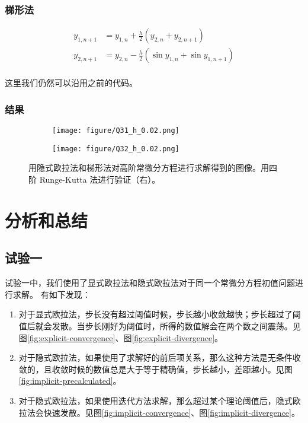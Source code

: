 \documentclass{article}
\begin{document}
\subsubsection{梯形法}
\begin{equation*}
    \begin{aligned}
        y_{1,n+1}&=y_{1,n}+\frac{h}{2}(y_{2,n}+y_{2,n+1})\\
        y_{2,n+1}&=y_{2,n}-\frac{h}{2}(\sin y_{1,n}+\sin y_{1,n+1})\\
    \end{aligned}
\end{equation*}

这里我们仍然可以沿用之前的代码。

\subsubsection{结果}
\begin{figure*}[h]
    \centering
    \begin{subfigure}[h]{0.45\textwidth}
        \centering
        \texttt{[image: figure/Q31\_h\_0.02.png]}
    \end{subfigure}
    \centering
    \begin{subfigure}[h]{0.45\textwidth}
        \centering
        \texttt{[image: figure/Q32\_h\_0.02.png]}
    \end{subfigure}
    \caption{用隐式欧拉法和梯形法对高阶常微分方程进行求解得到的图像。用四阶 Runge-Kutta 法进行验证（右）。}
    \label{fig:system}
\end{figure*}


\section{分析和总结}
\subsection{试验一}
试验一中，我们使用了显式欧拉法和隐式欧拉法对于同一个常微分方程初值问题进行求解。
有如下发现：
\begin{enumerate}
    \item 对于显式欧拉法，步长没有超过阈值时候，步长越小收敛越快；步长超过了阈值后就会发散。当步长刚好为阈值时，所得的数值解会在两个数之间震荡。见图\ref{fig:explicit-convergence}、图\ref{fig:explicit-divergence}。
    \item 对于隐式欧拉法，如果使用了求解好的前后项关系，那么这种方法是无条件收敛的，且收敛时候的数值总是大于等于精确值，步长越小，差距越小。见图\ref{fig:implicit-precalculated}。
    \item 对于隐式欧拉法，如果使用迭代方法求解，那么超过某个理论阈值后，隐式欧拉法会快速发散。见图\ref{fig:implicit-convergence}、图\ref{fig:implicit-divergence}。
\end{enumerate}
\end{document}

